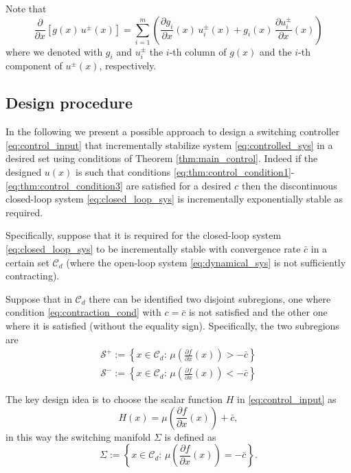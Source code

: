 \documentclass[letterpaper, 10 pt, conference]{ieeeconf}
\begin{document}
Note that
\begin{equation*}
\frac{\partial}{\partial x}\left[ g(x)\,u^\pm(x) \right]=
\sum_{i=1}^m\left( \frac{\partial g_i}{\partial x}(x)\,u^\pm_i(x)+g_i(x)\,\frac{\partial u^\pm_i}{\partial x}(x)  \right)
\end{equation*}
where we denoted with $g_i$ and $u^\pm_i$ the $i$-th column of $g(x)$ and the $i$-th component of $u^\pm(x)$, respectively.

\subsection{Design procedure}

In the following we present a possible approach to design a switching controller \eqref{eq:control_input} that incrementally stabilize system \eqref{eq:controlled_sys} in a desired set using conditions of Theorem \ref{thm:main_control}. Indeed if the designed $u(x)$ is such that conditions \eqref{eq:thm:control_condition1}-\eqref{eq:thm:control_condition3} are satisfied for a desired $c$ then the discontinuous closed-loop system \eqref{eq:closed_loop_sys} is incrementally exponentially stable as required.

Specifically, suppose that it is required for the closed-loop system \eqref{eq:closed_loop_sys} to be incrementally stable with convergence rate $\bar{c}$ in a certain set $\mathcal{C}_d$ (where the open-loop system \eqref{eq:dynamical_sys} is not sufficiently contracting).

Suppose that in $\mathcal{C}_d$ there can be identified two disjoint subregions, one where condition \eqref{eq:contraction_cond} with $c=\bar{c}$ is not satisfied and the other one where it is satisfied (without the equality sign). Specifically, the two subregions are 
\begin{eqnarray*}
\mathcal{S}^+:= \left\{ x\in\mathcal{C}_d:\, \mu\left( \frac{\partial f}{\partial x}(x) \right)>-\bar{c} \right\}\\
\mathcal{S}^-:= \left\{ x\in\mathcal{C}_d:\, \mu\left( \frac{\partial f}{\partial x}(x) \right)<-\bar{c} \right\}
\end{eqnarray*}

The key design idea is to choose the scalar function $H$ in \eqref{eq:control_input} as
\begin{equation}
\label{eq:H_control}
H(x)=\mu\left(\frac{\partial f}{\partial x}(x)\right)+\bar{c},
\end{equation}
in this way the switching manifold $\Sigma$ is defined as 
\begin{equation}
\label{eq:Sigma_control}
\Sigma := \left\{ x\in\mathcal{C}_d:\, \mu\left(\frac{\partial f}{\partial x}(x)\right)=-\bar{c} \right\}.
\end{equation}
\end{document}

